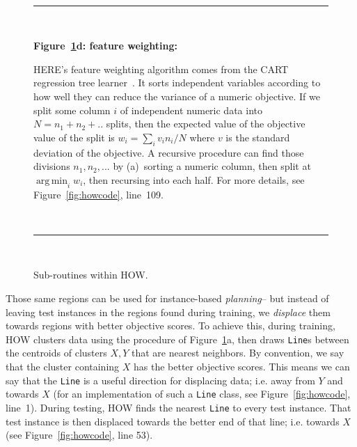 \documentclass[conference]{IEEEtran}
\newcommand{\fig}[1]{Figure~\ref{fig:#1}}
\DeclareMathOperator*{\argmin}{arg\,min}
\begin{document}
\begin{figure}[t!]
~\hrule~

{\bf \fig{where}d: feature weighting:}

HERE's feature weighting algorithm
comes from the CART regression tree learner~\cite{Breiman1984}.
It sorts independent variables
 according to how well they can reduce the variance
of a  numeric objective.
If we split some column $i$ of independent numeric data  into $N=n_1 + n_2 + ..$ splits,
then the expected
value of the objective value of the split  is $w_i = \sum_i v_in_i/N$
where $v$ is the standard deviation of the objective.
A recursive procedure can  find those divisions $n_1,n_2,...$ by (a)~sorting a numeric column,
then split at $\argmin_i w_i$, then recursing into each half.  For more details, see  \fig{howcode}, line~109.

~\hrule~
 
\caption{Sub-routines within HOW.}\label{fig:where}
\end{figure}





Those same regions can be used for instance-based 
{\em planning}-- but instead of leaving test instances in the regions
found during training, we {\em displace} them towards regions
with better objective scores.
To achieve this, 
during training, HOW clusters data using the procedure of \fig{where}a,
then draws {\tt Line}s between the centroids of  clusters $X,Y$ that are nearest
neighbors.
By convention, we say that the cluster containing $X$ has the  better objective scores. This means we can say that the {\tt Line} is a useful direction for displacing
data; i.e.  away from $Y$ and towards $X$ (for an implementation of such a {\tt Line} class, see \fig{howcode}, line~1).
 During testing,  HOW   finds the  nearest {\tt Line} to every test instance. That  test instance is   then displaced towards the better end
of that line; i.e. towards  $X$ (see \fig{howcode}, line 53).
\end{document}
